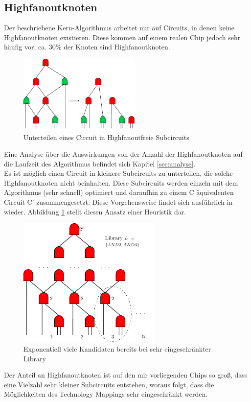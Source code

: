 \documentclass[11pt, a4paper, german]{article}
\begin{document}
\subsection{Highfanoutknoten}
\label{subsec:highfanout}
Der beschriebene Kern-Algorithmus arbeitet nur auf Circuits, in denen keine Highfanoutknoten existieren. Diese kommen auf einem realen Chip jedoch sehr häufig vor; ca. $30\%$ der Knoten sind Highfanoutknoten. 
 \begin{figure}
		\includegraphics[width = 6cm]{pictures/compiled/ohne_highfanout_heu}
		\caption{Unterteilen eines Circuit in Highfanoutfreie Subcircuits}
		\label{bild:ohne_highfanout_heu}
\end{figure}
Eine Analyse über die Auswirkungen von der Anzahl der Highfanoutknoten auf die Laufzeit des Algorithmus befindet sich Kapitel \ref{sec:analyse}.\\

Es ist möglich einen Circuit in kleinere Subcircuits zu unterteilen, die solche Highfanoutknoten nicht beinhalten. Diese Subcircuits werden einzeln mit dem Algorithmus (sehr schnell) optimiert und daraufhin zu einem C äquivalenten Circuit C' zusammengesetzt. Diese Vorgehensweise findet sich ausführlich in \cite{DAGON} wieder. Abbildung \ref{bild:ohne_highfanout_heu} stellt diesen Ansatz einer Heuristik dar. 
   \begin{figure}%
\includegraphics[width= 7cm]{pictures/compiled/expo_kand}
\caption{Exponentiell viele Kandidaten bereits bei sehr eingeschränkter Library}
\label{bild:expo_kan}
\end{figure}
  Der Anteil an Highfanoutknoten ist auf den mir vorliegenden Chips so groß, dass eine Vielzahl sehr kleiner Subcircuits entstehen, woraus folgt, dass die Möglichkeiten des Technology Mappings sehr eingeschränkt werden. 
\end{document}
